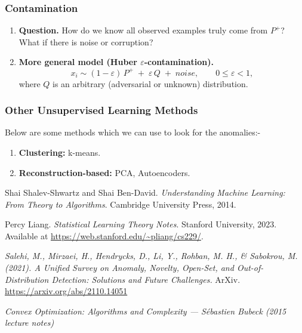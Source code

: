 \documentclass[11pt]{article}
\theoremstyle{plain}
\begin{document}
\subsubsection{Contamination}
\begin{enumerate}
  \item \textbf{Question.} How do we know all observed examples truly come from $P^{+}$? What if there is noise or corruption?
  \item \textbf{More general model (Huber $\varepsilon$-contamination).}
  \[
    x_i \sim (1-\varepsilon)\,P^{+} \;+\; \varepsilon\,Q\;+\;noise,\qquad 0\le \varepsilon<1,
  \]
  where $Q$ is an arbitrary (adversarial or unknown) distribution.
\end{enumerate}

\subsubsection{Other Unsupervised Learning Methods}
Below are some methods which we can use to look for the anomalies:-
\begin{enumerate}
  \item \textbf{Clustering:} k-means.
  \item \textbf{Reconstruction-based:} PCA, Autoencoders.
\end{enumerate}



\begin{thebibliography}{99}

Shai Shalev-Shwartz and Shai Ben-David.
\newblock \emph{Understanding Machine Learning: From Theory to Algorithms}.
\newblock Cambridge University Press, 2014.

Percy Liang.
\newblock \emph{Statistical Learning Theory Notes}.
\newblock Stanford University, 2023.
\newblock Available at \url{https://web.stanford.edu/~pliang/cs229/}.

\newblock \emph{Salehi, M., Mirzaei, H., Hendrycks, D., Li, Y., Rohban, M. H., & Sabokrou, M. (2021). A Unified Survey on Anomaly, Novelty, Open-Set, and Out-of-Distribution Detection: Solutions and Future Challenges.}
\newblock ArXiv. \url{https://arxiv.org/abs/2110.14051}

\newblock \emph{Convex Optimization: Algorithms and Complexity — Sébastien Bubeck (2015 lecture notes)}


\end{thebibliography}
\end{document}
